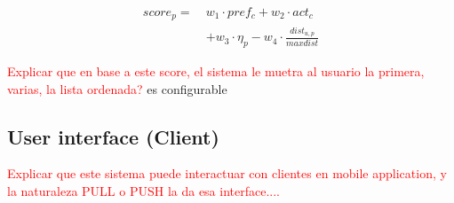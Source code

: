 
\begin{equation} \label{eq:score}
    \begin{split}
score_p =   \ &w_1 \cdot pref_c + w_2 \cdot act_c \\
                                        &+ w_3 \cdot \eta_p - w_4 \cdot \frac{dist_{u,p}}{maxdist}
    \end{split}
\end{equation}

\textcolor{red}{Explicar que en base a este score, el sistema le muetra al usuario la primera, varias, la lista ordenada?} es configurable

\subsection{User interface (Client)}

\textcolor{red}{Explicar que este sistema puede interactuar con clientes en mobile application, y la naturaleza PULL o PUSH la da esa interface.... }



